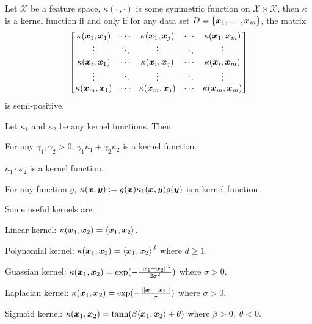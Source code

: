 \begin{thm}
    Let $\mathcal{X}$ be a feature space, $\kappa(\cdot\,, \cdot)$ is some symmetric function on 
    $\mathcal{X} \times \mathcal{X}$, then $\kappa$ is a kernel function if and only if for any data set
    $D = \{\boldsymbol{x}_1, \dotsc, \boldsymbol{x}_m\}$, the matrix
    \begin{equation*}
        \begin{bmatrix}
            \kappa(\boldsymbol{x}_1, \boldsymbol{x}_1) &\cdots &\kappa(\boldsymbol{x}_1, \boldsymbol{x}_j) &\cdots &\kappa(\boldsymbol{x}_1, \boldsymbol{x}_m)\\
            \vdots                   &\ddots &\vdots                   &\ddots &\vdots\\
            \kappa(\boldsymbol{x}_i, \boldsymbol{x}_1) &\cdots &\kappa(\boldsymbol{x}_i, \boldsymbol{x}_j) &\cdots &\kappa(\boldsymbol{x}_i, \boldsymbol{x}_m)\\
            \vdots                   &\ddots &\vdots                   &\ddots &\vdots\\
            \kappa(\boldsymbol{x}_m, \boldsymbol{x}_1) &\cdots &\kappa(\boldsymbol{x}_m, \boldsymbol{x}_j) &\cdots &\kappa(\boldsymbol{x}_m, \boldsymbol{x}_m)
        \end{bmatrix}
    \end{equation*}
    is semi-positive.
\end{thm}

\begin{prop}
    Let $\kappa_1$ and $\kappa_2$ be any kernel functions. Then
    \begin{compactenum}
        \item For any $\gamma_1, \gamma_2 > 0$, $\gamma_1 \kappa_1 + \gamma_2 \kappa_2$ is a kernel function.
        \item $\kappa_1 \cdot \kappa_2$ is a kernel function.
        \item For any function $g$, $\kappa(\boldsymbol{x}, \boldsymbol{y}) := g(\boldsymbol{x})\kappa_1(\boldsymbol{x}, \boldsymbol{y})g(\boldsymbol{y})$ is a 
        kernel function.
    \end{compactenum}
\end{prop}
Some useful kernels are:
\begin{compactenum}
    \item Linear kernel: $\kappa(\boldsymbol{x}_1, \boldsymbol{x}_2) = \langle \boldsymbol{x}_1, \boldsymbol{x}_2 \rangle$.
    \item Polynomial kernel: $\kappa(\boldsymbol{x}_1, \boldsymbol{x}_2) = {\langle \boldsymbol{x}_1, \boldsymbol{x}_2 \rangle}^d$ where 
    $d \geqslant 1$.
    \item Guassian kernel: $\kappa(\boldsymbol{x}_1, \boldsymbol{x}_2) = \exp(-\frac{||\boldsymbol{x}_1 - \boldsymbol{x}_2||^2}{2\sigma^2})$ where
    $\sigma > 0$.
    \item Laplacian kernel: $\kappa(\boldsymbol{x}_1, \boldsymbol{x}_2) = \exp(-\frac{||\boldsymbol{x}_1 - \boldsymbol{x}_2||}{\sigma})$ where
    $\sigma > 0$.
    \item Sigmoid kernel: $\kappa(\boldsymbol{x}_1, \boldsymbol{x}_2) = \tanh(\beta \langle \boldsymbol{x}_1, \boldsymbol{x}_2\rangle + \theta)$
    where $\beta > 0,\;\theta < 0$.
\end{compactenum}

